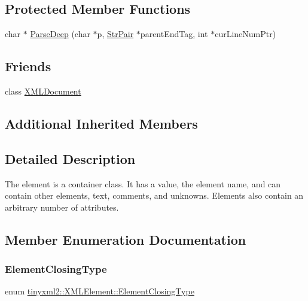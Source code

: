 \subsection*{Protected Member Functions}
\begin{DoxyCompactItemize}
\item 
char $\ast$ \mbox{\hyperlink{classtinyxml2_1_1_x_m_l_element_a072998100b7d0ba5e8aeac6dd6dfb31b}{Parse\+Deep}} (char $\ast$p, \mbox{\hyperlink{classtinyxml2_1_1_str_pair}{Str\+Pair}} $\ast$parent\+End\+Tag, int $\ast$cur\+Line\+Num\+Ptr)
\end{DoxyCompactItemize}
\subsection*{Friends}
\begin{DoxyCompactItemize}
\item 
class \mbox{\hyperlink{classtinyxml2_1_1_x_m_l_element_a4eee3bda60c60a30e4e8cd4ea91c4c6e}{X\+M\+L\+Document}}
\end{DoxyCompactItemize}
\subsection*{Additional Inherited Members}


\subsection{Detailed Description}
The element is a container class. It has a value, the element name, and can contain other elements, text, comments, and unknowns. Elements also contain an arbitrary number of attributes. 

\subsection{Member Enumeration Documentation}
\mbox{\label{classtinyxml2_1_1_x_m_l_element_ab5f90e2493c35702175235127e2935b4}} 
\subsubsection{\texorpdfstring{Element\+Closing\+Type}{ElementClosingType}}
{\footnotesize\ttfamily enum \mbox{\hyperlink{classtinyxml2_1_1_x_m_l_element_ab5f90e2493c35702175235127e2935b4}{tinyxml2\+::\+X\+M\+L\+Element\+::\+Element\+Closing\+Type}}}

